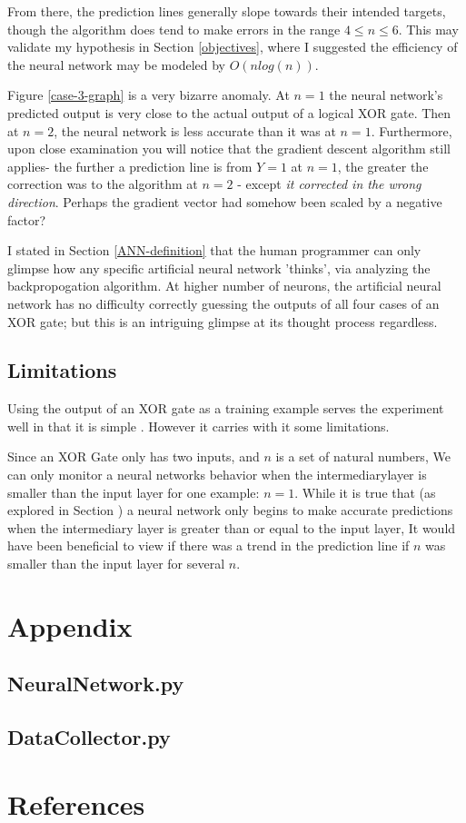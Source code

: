 \documentclass[12pt]{article}
\begin{document}
From there, the prediction lines generally slope towards their intended targets, though the algorithm does tend to make errors in the range $4 \leq n \leq 6$. This may validate my hypothesis in Section \ref{objectives}, where I suggested the efficiency of the neural network may be modeled by $O(n log(n))$.

Figure \ref{case-3-graph} is a very bizarre anomaly. At $n = 1$ the neural network's predicted output is very close to the actual output of a logical XOR gate. Then at $n = 2$, the neural network is less accurate than it was at $n = 1$. Furthermore, upon close examination you will notice that the gradient descent algorithm still applies- the further a prediction line is from $Y = 1$ at $n = 1$, the greater the correction was to the algorithm at $n = 2$ - except \textit{it corrected in the wrong direction}. Perhaps the gradient vector had somehow been scaled by a negative factor?

I stated in Section \ref{ANN-definition} that the human programmer can only glimpse how any specific artificial neural network 'thinks', via analyzing the backpropogation algorithm. At higher number of neurons, the artificial neural network has no difficulty correctly guessing the outputs of all four cases of an XOR gate; but this is an intriguing glimpse at its thought process regardless.

\subsection{Limitations}

Using the output of an XOR gate as a training example serves the experiment well in that it is simple . However it carries with it some limitations.

Since an XOR Gate only has two inputs, and $n$ is a set of natural numbers, We can only monitor a neural networks behavior when the intermediarylayer is smaller than the input layer for one example: $n = 1$. While it is true that (as explored in Section \label{conclusions}) a neural network only begins to make accurate predictions when the intermediary layer is greater than or equal to the input layer, It would have been beneficial to view if there was a trend in the prediction line if $n$ was smaller than the input layer for several $n$.


\section{Appendix}

\subsection{NeuralNetwork.py \label{neuralnetpy}}


\pagebreak

\subsection{DataCollector.py\label{datacollectorpy}}


\pagebreak

\section{References}

\printbibliography[heading=none]
\end{document}
